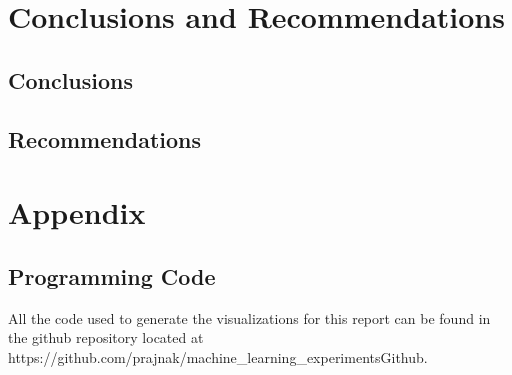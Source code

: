 \documentclass[letterpaper,12pt,titlepage,oneside,final]{report}
\newcommand{\href}[1]{#1} %
\begin{document}
\begin{figure}[!ht]
\begin{subfigure}[t]{0.45\textwidth}
                    \caption{}
                    \label{knnvarimp}
                \end{subfigure}
                \end{figure}
                

\chapter{Conclusions and Recommendations}
    \section{Conclusions}
    \section{Recommendations}

\appendix
\chapter{Appendix}
    \section{Programming Code}
        All the code used to generate the visualizations for this report can be found in the github repository located at \href{https://github.com/prajnak/machine_learning_experiments}{Github}.
\end{document}

